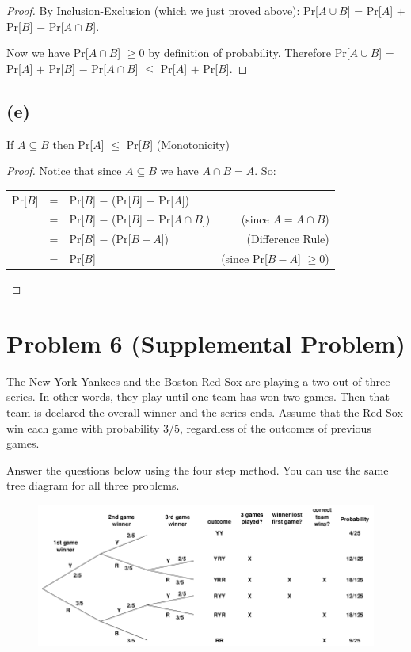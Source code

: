 \documentclass[14pt]{extarticle}
\begin{document}
\begin{proof}
By Inclusion-Exclusion (which we just proved above): Pr[$A \cup B$] = Pr[$A$] $+$ Pr[$B$] $-$ Pr[$A \cap B$].

Now we have Pr[$A \cap B$] $\geq 0$ by definition of probability. Therefore Pr[$A \cup B$] = Pr[$A$] $+$ Pr[$B$] $-$ Pr[$A \cap B$] $\leq$ Pr[$A$] $+$ Pr[$B$].
\end{proof}

\subsection{(e)}
If $A \subseteq B$ then Pr[$A$] $\leq$ Pr[$B$] (Monotonicity)

\begin{proof}
Notice that since $A \subseteq B$ we have $A \cap B = A$. So:

\begin{tabular}{rclr}
Pr[$B$]&=&Pr[$B$] $-$ (Pr[$B$] $-$ Pr[$A$])&\\
&=&Pr[$B$] $-$ (Pr[$B$] $-$ Pr[$A \cap B$])& (since $A = A \cap B$)\\
&=&Pr[$B$] $-$ (Pr[$B-A$])& (Difference Rule)\\
&=&Pr[$B$]& (since Pr[$B-A$] $\geq 0$)
\end{tabular}
\end{proof}

\section{Problem 6 (Supplemental Problem)}
The New York Yankees and the Boston Red Sox are playing a two-out-of-three series. In other words, they play until one team has won two games. Then that team is declared the overall winner and the series ends. Assume that the Red Sox win each game with probability 3/5, regardless of the outcomes of previous games.

Answer the questions below using the four step method. You can use the same tree diagram for all three problems.

\begin{figure}[ht!]
\centering
\includegraphics[scale=0.6]{red-sox.png}
\end{figure}
\end{document}
